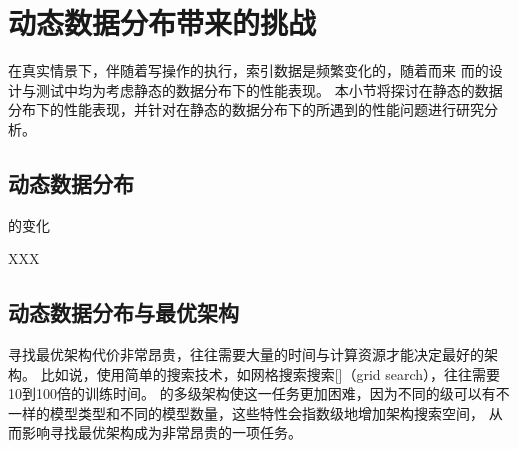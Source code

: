 \section{动态数据分布带来的挑战}

在真实情景下，伴随着写操作的执行，索引数据是频繁变化的，随着而来
而{\li}的设计与测试中均为考虑静态的数据分布下的性能表现。
本小节将探讨{\li}在静态的数据分布下的性能表现，并针对{\li}在静态的数据分布下的所遇到的性能问题进行研究分析。

\subsection{动态数据分布}

{\cdf}的变化

XXX

\subsection{动态数据分布与最优{\li}架构}

寻找最优{\li}架构代价非常昂贵，往往需要大量的时间与计算资源才能决定最好的{\li}架构。
比如说，使用简单的搜索技术，如网格搜索搜索[]（grid search），往往需要10到100倍的训练时间。
{\li}的多级架构使这一任务更加困难，因为不同的级可以有不一样的模型类型和不同的模型数量，这些特性会指数级地增加架构搜索空间，
从而影响寻找最优{\li}架构成为非常昂贵的一项任务。



% 

